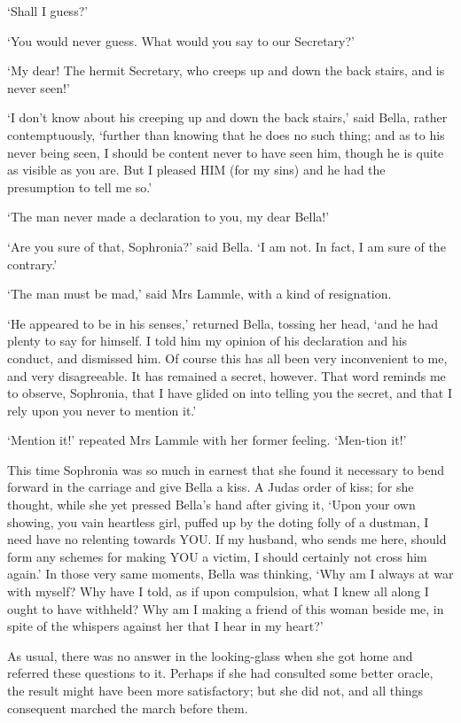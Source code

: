 ‘Shall I guess?’

‘You would never guess. What would you say to our Secretary?’

‘My dear! The hermit Secretary, who creeps up and down the back stairs,
and is never seen!’

‘I don’t know about his creeping up and down the back stairs,’ said
Bella, rather contemptuously, ‘further than knowing that he does no such
thing; and as to his never being seen, I should be content never to have
seen him, though he is quite as visible as you are. But I pleased HIM
(for my sins) and he had the presumption to tell me so.’

‘The man never made a declaration to you, my dear Bella!’

‘Are you sure of that, Sophronia?’ said Bella. ‘I am not. In fact, I am
sure of the contrary.’

‘The man must be mad,’ said Mrs Lammle, with a kind of resignation.

‘He appeared to be in his senses,’ returned Bella, tossing her head,
‘and he had plenty to say for himself. I told him my opinion of his
declaration and his conduct, and dismissed him. Of course this has all
been very inconvenient to me, and very disagreeable. It has remained a
secret, however. That word reminds me to observe, Sophronia, that I have
glided on into telling you the secret, and that I rely upon you never to
mention it.’

‘Mention it!’ repeated Mrs Lammle with her former feeling. ‘Men-tion
it!’

This time Sophronia was so much in earnest that she found it necessary
to bend forward in the carriage and give Bella a kiss. A Judas order of
kiss; for she thought, while she yet pressed Bella’s hand after giving
it, ‘Upon your own showing, you vain heartless girl, puffed up by the
doting folly of a dustman, I need have no relenting towards YOU. If my
husband, who sends me here, should form any schemes for making YOU a
victim, I should certainly not cross him again.’ In those very same
moments, Bella was thinking, ‘Why am I always at war with myself? Why
have I told, as if upon compulsion, what I knew all along I ought to
have withheld? Why am I making a friend of this woman beside me, in
spite of the whispers against her that I hear in my heart?’

As usual, there was no answer in the looking-glass when she got home and
referred these questions to it. Perhaps if she had consulted some better
oracle, the result might have been more satisfactory; but she did not,
and all things consequent marched the march before them.

